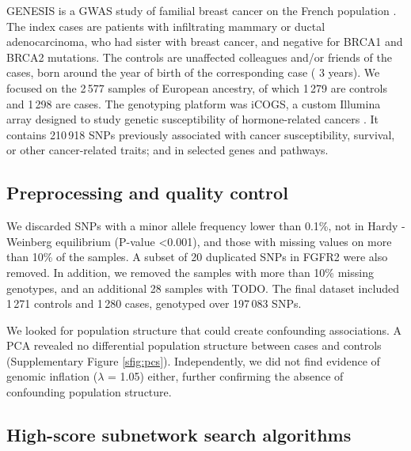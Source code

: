 \documentclass[twocolumn, 10pt]{article}
\begin{document}
GENESIS is a GWAS study of familial breast cancer on the French population \cite{sinilnikova_genesis:_2016}. The index cases are patients with infiltrating mammary or ductal adenocarcinoma, who had sister with breast cancer, and negative for BRCA1 and BRCA2 mutations. The controls are unaffected colleagues and/or friends of the cases, born around the year of birth of the corresponding case (\textpm{} 3 years). We focused on the 2\,577 samples of European ancestry, of which 1\,279 are controls and 1\,298 are cases. The genotyping platform was iCOGS, a custom Illumina array designed to study genetic susceptibility of hormone-related cancers \cite{sakoda_turning_2013}. It contains 210\,918 SNPs previously associated with cancer susceptibility, survival, or other cancer-related traits; and in selected genes and pathways.

\subsection{Preprocessing and quality control}
\label{sec:orgd26c48b}

We discarded SNPs with a minor allele frequency lower than 0.1\%, not in Hardy - Weinberg equilibrium (P-value \textless 0.001), and those with missing values on more than 10\% of the samples. A subset of 20 duplicated SNPs in FGFR2 were also removed. In addition, we removed the samples with more than 10\% missing genotypes, and an additional 28 samples with TODO. The final dataset included 1\,271 controls and 1\,280 cases, genotyped over 197\,083 SNPs. 

We looked for population structure that could create confounding associations. A PCA revealed no differential population structure between cases and controls (Supplementary Figure \ref{sfig:pcs}). Independently, we did not find evidence of genomic inflation (\(\lambda\) = 1.05) either, further confirming the absence of confounding population structure.

\subsection{High-score subnetwork search algorithms}
\label{sec:org6ced6c9}
\end{document}

